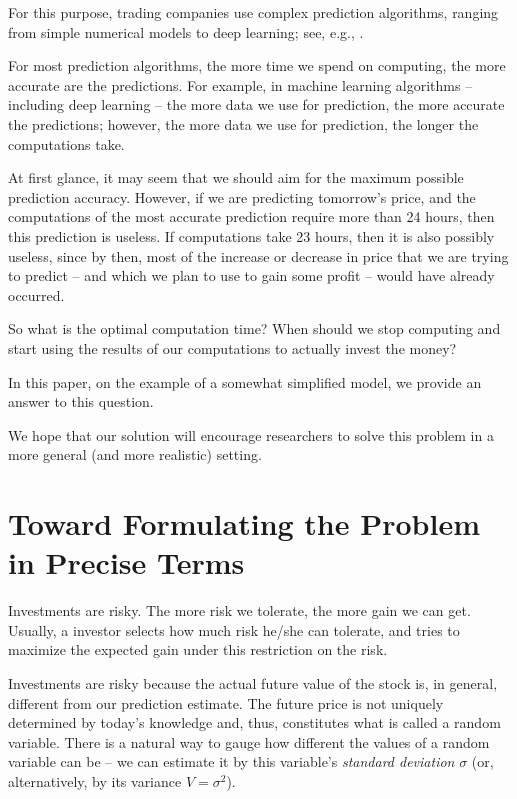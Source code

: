 \documentclass{article}
\begin{document}
For this purpose, trading companies use complex prediction
algorithms, ranging from simple numerical models to deep learning;
see, e.g., \cite{Goodfellow 2016}.
\medskip

 For most prediction
algorithms, the more time we spend on computing, the more accurate
are the predictions. For example, in machine learning algorithms --
including deep learning -- the more data we use for prediction, the
more accurate the predictions; however, the more data we use for prediction, 
the longer the computations
take.

At first glance, it may seem that we should aim for the maximum
possible prediction accuracy. However, if we are predicting tomorrow's
price, and the computations of the most accurate prediction require
more than 24 hours, then this prediction is useless. If computations take 23
hours, then it is also possibly useless, since by then, most of the
increase or decrease in price that we are trying to predict -- and which we plan to use to gain some profit -- would
have already occurred.

So what is the optimal computation time? When should we stop
computing and start using the results of our computations to
actually invest the money?
\medskip

 In this paper, on the example
of a somewhat simplified model, we provide an answer to this
question. 

We hope that our solution will encourage researchers to solve
this problem in a more general (and more realistic) setting.

\section{Toward Formulating the Problem in Precise Terms}

 Investments are risky.
The more risk we tolerate, the more gain we can get. Usually, a
investor selects how much risk he/she can tolerate, and tries to
maximize the expected gain under this restriction on the risk.
\medskip

 Investments are risky because
the actual future value of the stock is, in general, different from
our prediction estimate. The future price is not uniquely
determined by today's knowledge and, thus, constitutes what is
called a random variable. There is a natural way to gauge how
different the values of a random variable can be -- we can estimate
it by this variable's {\it standard deviation} $\sigma$ (or,
alternatively, by its variance $V=\sigma^2$).
\end{document}
